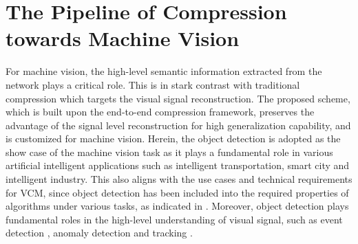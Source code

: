 \documentclass[transmag]{IEEEtran}
\begin{document}
\section{The Pipeline of Compression towards Machine Vision}
For machine vision, the high-level semantic information extracted from the network plays a critical role. This is in stark contrast with traditional compression which targets the visual signal reconstruction. 
The proposed scheme, which is built upon the end-to-end compression framework, preserves the advantage of the signal level reconstruction for high generalization capability, and is customized for machine vision. 
Herein, the object detection is adopted as the show case of the machine vision task as it plays a fundamental role in various artificial intelligent applications such as intelligent transportation, smart city and intelligent industry. This also aligns with the use cases and technical requirements for VCM, since object detection has been included into the required properties of algorithms under various tasks, as indicated in \cite{vcmuse}.
Moreover, object detection plays fundamental roles in the high-level understanding of visual signal, such as event detection \cite{ke2007event}, anomaly detection \cite{basharat2008learning} and tracking \cite{balaji2017survey}.
\end{document}
